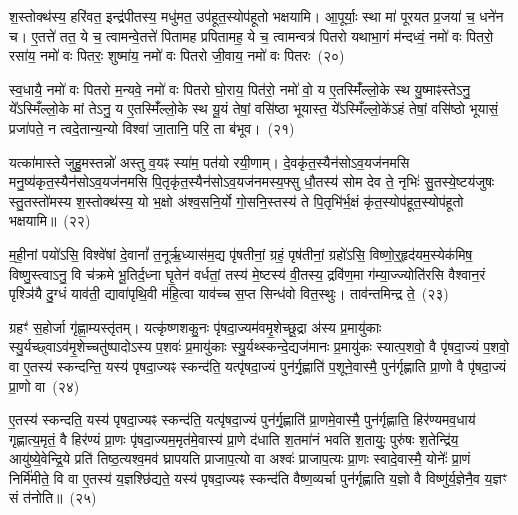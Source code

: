 श॒स्तोक्थ॑स्य॒ हरि॑वत॒ इन्द्र॑पीतस्य॒ मधु॑मत॒ उप॑हूत॒स्योप॑हूतो भक्षयामि। आ॒पूर्याः॒ स्था मा॑ पूरयत प्र॒जया॑ च॒ धने॑न च। ए॒तत्ते॑ तत॒ ये च॒ त्वामन्वे॒तत्ते॑ पितामह प्रपितामह॒ ये च॒ त्वामन्वत्र॑ पितरो यथाभा॒गं म॑न्दध्वं॒ नमो॑ वः पितरो॒ रसा॑य॒ नमो॑ वः पितरः॒ शुष्मा॑य॒ नमो॑ वः पितरो जी॒वाय॒ नमो॑ वः पितरः~(२०)\ip

स्व॒धायै॒ नमो॑ वः पितरो म॒न्यवे॒ नमो॑ वः पितरो घो॒राय॒ पित॑रो॒ नमो॑ वो॒ य ए॒तस्मिँ॑ल्लो॒के स्थ यु॒ष्माꣴस्ते\-ऽनु॒ ये᳚\-ऽस्मिँल्लो॒के मां ते\-ऽनु॒ य ए॒तस्मिँ॑ल्लो॒के स्थ यू॒यं तेषां॒ वसि॑ष्ठा भूयास्त॒ ये᳚\-ऽस्मिँल्लो॒के॑\-ऽहं तेषां॒ वसि॑ष्ठो भूयासं॒ प्रजा॑पते॒ न त्वदे॒तान्य॒न्यो विश्वा॑ जा॒तानि॒ परि॒ ता ब॑भूव।~(२१)\ip

यत्का॑मास्ते जुहु॒मस्तन्नो॑ अस्तु व॒यꣴ स्या॑म॒ पत॑यो रयी॒णाम्। दे॒वकृ॑त॒स्यैन॑सो\-ऽव॒यज॑नमसि मनु॒ष्य॑कृत॒स्यैन॑सो\-ऽ\-व॒यज॑नमसि पि॒तृकृ॑त॒स्यैन॑सो\-ऽव॒यज॑नमस्य॒फ्सु धौ॒तस्य॑ सोम देव ते॒ नृभिः॑ सु॒तस्ये॒ष्टय॑जुषः स्तु॒तस्तो॑मस्य श॒स्तोक्थ॑स्य॒ यो भ॒क्षो अ॑श्व॒सनि॒र्यो गो॒सनि॒स्तस्य॑ ते पि॒तृभि॑र्भ॒क्षं कृ॑त॒स्योप॑हूत॒स्योप॑हूतो भक्षयामि॥~(२२)\ip

{}

म॒ही॒नां पयो॑\-ऽसि॒ विश्वे॑षां दे॒वानां᳚ त॒नूर्\mbox{}ऋ॒ध्यास॑म॒द्य पृ॑षतीनां॒ ग्रहं॒ पृष॑तीनां॒ ग्रहो॑\-ऽसि॒ विष्णो॒र्॒\mbox{}हृद॑यम॒स्येक॑मिष॒ विष्णु॒स्त्वा\-ऽनु॒ वि च॑क्रमे भू॒तिर्द॒ध्ना घृ॒तेन॑ वर्धतां॒ तस्य॑ मे॒ष्टस्य॑ वी॒तस्य॒ द्रवि॑ण॒मा ग॑म्या॒ज्ज्योति॑रसि वैश्वान॒रं पृश्ञि॑यै दु॒ग्धं याव॑ती॒ द्यावा॑\-पृथि॒वी म॑हि॒त्वा याव॑च्च स॒प्त सिन्ध॑वो वित॒स्थुः। ताव॑न्तमिन्द्र ते॒~(२३)\ip

ग्रहꣳ॑ स॒होर्जा गृ॑ह्णा॒म्यस्तृ॑तम्। यत्कृ॑ष्णशकु॒नः पृ॑षदा॒ज्यम॑व\-मृ॒शेच्छू॒द्रा अ॑स्य प्र॒मायु॑काः स्यु॒र्यच्छ्वा\-ऽव॑मृ॒शेच्चतु॑ष्पादो\-ऽस्य प॒शवः॑ प्र॒मायु॑काः स्यु॒र्यथ्स्कन्दे॒द्यज॑मानः प्र॒मायु॑कः स्यात्प॒शवो॒ वै पृ॑षदा॒ज्यं प॒शवो॒ वा ए॒तस्य॑ स्कन्दन्ति॒ यस्य॑ पृषदा॒ज्यꣴ स्कन्द॑ति॒ यत्पृ॑षदा॒ज्यं पुन॑र्गृ॒ह्णाति॑ प॒शूने॒वास्मै॒ पुन॑र्गृह्णाति प्रा॒णो वै पृ॑षदा॒ज्यं प्रा॒णो वा~(२४)\ip

ए॒तस्य॑ स्कन्दति॒ यस्य॑ पृषदा॒ज्यꣴ स्कन्द॑ति॒ यत्पृ॑षदा॒ज्यं पुन॑र्गृ॒ह्णाति॑ प्रा॒णमे॒वास्मै॒ पुन॑र्गृह्णाति॒ हिर॑ण्यमव॒धाय॑ गृह्णात्य॒मृतं॒ वै हिर॑ण्यं प्रा॒णः पृ॑षदा॒ज्यम॒मृत॑मे॒वास्य॑ प्रा॒णे द॑धाति श॒तमा॑नं भवति श॒तायुः॒ पुरु॑षः श॒तेन्द्रि॑य॒ आयु॑ष्ये॒वेन्द्रि॒ये प्रति॑ तिष्ठ॒त्यश्व॒मव॑ घ्रापयति प्राजाप॒त्यो वा अश्वः॑ प्राजाप॒त्यः प्रा॒णः स्वादे॒वास्मै॒ योनेः᳚ प्रा॒णं निर्मि॑मीते॒ वि वा ए॒तस्य॑ य॒ज्ञश्छि॑द्यते॒ यस्य॑ पृषदा॒ज्यꣴ स्कन्द॑ति वैष्ण॒व्यर्चा पुन॑र्गृह्णाति य॒ज्ञो वै विष्णु॑र्य॒ज्ञेनै॒व य॒ज्ञꣳ सं त॑नोति॥~(२५)\ip

